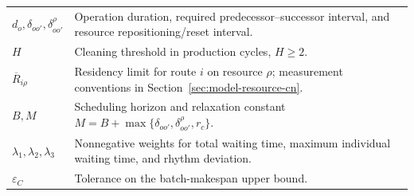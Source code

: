 \documentclass[final,5p,times,twocolumn]{elsarticle}
\begin{document}
\begin{table}[!t]
\begin{tabular}{@{}C{0.20\textwidth}C{\textwidth-8pt\relax}@{}}
$d_o,\delta_{oo'},\delta^\rho_{oo'}$ & Operation duration, required predecessor--successor interval, and resource repositioning/reset interval.\\
$H$ & Cleaning threshold in production cycles, $H\ge2$.\\
$\overline R_{i\rho}$ & Residency limit for route $i$ on resource $\rho$; measurement conventions in Section~\ref{sec:model-resource-cn}.\\
$B,M$ & Scheduling horizon and relaxation constant $M=B+\max\{\delta_{oo'},\delta^\rho_{oo'},r_c\}$.\\
$\lambda_1,\lambda_2,\lambda_3$ & Nonnegative weights for total waiting time, maximum individual waiting time, and rhythm deviation.\\
$\varepsilon_C$ & Tolerance on the batch-makespan upper bound.\\
\bottomrule
\end{tabular}
\end{table}
\end{document}
